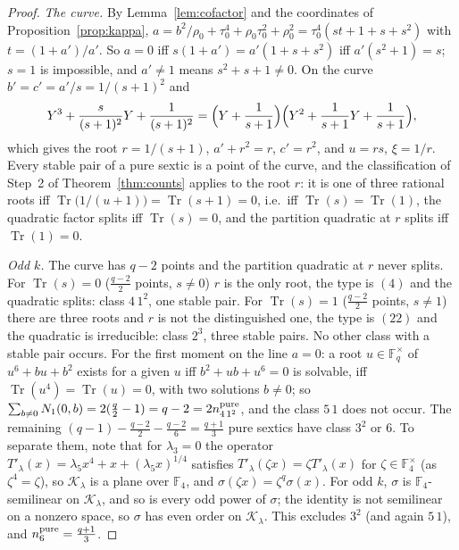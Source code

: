 \documentclass[12pt,a4paper]{amsart}
\theoremstyle{definition}
\newcommand{\F}{\mathbb{F}}
\newcommand{\Tr}{\operatorname{Tr}}
\newcommand{\Kk}{\mathcal{K}}
\begin{document}
\begin{proof}
\emph{The curve.} By Lemma~\ref{lem:cofactor} and the coordinates of Proposition~\ref{prop:kappa}, $a=b^2/\rho_0+\tau_0^4+\rho_0\tau_0^2+\rho_0^2=\tau_0^4(st+1+s+s^2)$ with $t=(1+a')/a'$. So $a=0$ iff $s(1+a')=a'(1+s+s^2)$ iff $a'(s^2+1)=s$; $s=1$ is impossible, and $a'\ne1$ means $s^2+s+1\ne0$. On the curve $b'=c'=a'/s=1/(s+1)^2$ and
\[
Y^3+\frac{s}{(s+1)^2}Y+\frac1{(s+1)^2}=\Bigl(Y+\frac1{s+1}\Bigr)\Bigl(Y^2+\frac1{s+1}Y+\frac1{s+1}\Bigr),
\]
which gives the root $r=1/(s+1)$, $a'+r^2=r$, $c'=r^2$, and $u=rs$, $\xi=1/r$. Every stable pair of a pure sextic is a point of the curve, and the classification of Step~2 of Theorem~\ref{thm:counts} applies to the root $r$: it is one of three rational roots iff $\Tr\bigl(1/(u+1)\bigr)=\Tr(s+1)=0$, i.e.\ iff $\Tr(s)=\Tr(1)$, the quadratic factor splits iff $\Tr(s)=0$, and the partition quadratic at $r$ splits iff $\Tr(1)=0$.

\emph{Odd $k$.} The curve has $q-2$ points and the partition quadratic at $r$ never splits. For $\Tr(s)=0$ ($\frac{q-2}2$ points, $s\ne0$) $r$ is the only root, the type is $(4)$ and the quadratic splits: class $4\,1^2$, one stable pair. For $\Tr(s)=1$ ($\frac{q-2}2$ points, $s\ne1$) there are three roots and $r$ is not the distinguished one, the type is $(22)$ and the quadratic is irreducible: class $2^3$, three stable pairs. No other class with a stable pair occurs. For the first moment on the line $a=0$: a root $u\in\F_q^\times$ of $u^6+bu+b^2$ exists for a given $u$ iff $b^2+ub+u^6=0$ is solvable, iff $\Tr(u^4)=\Tr(u)=0$, with two solutions $b\ne0$; so $\sum_{b\ne0}N_1(0,b)=2(\frac q2-1)=q-2=2n^{\rm pure}_{4\,1^2}$, and the class $5\,1$ does not occur. The remaining $(q-1)-\frac{q-2}2-\frac{q-2}6=\frac{q+1}3$ pure sextics have class $3^2$ or $6$. To separate them, note that for $\lambda_3=0$ the operator $T'_\lambda(x)=\lambda_5x^4+x+(\lambda_5x)^{1/4}$ satisfies $T'_\lambda(\zeta x)=\zeta T'_\lambda(x)$ for $\zeta\in\F_4^\times$ (as $\zeta^4=\zeta$), so $\Kk_\lambda$ is a plane over $\F_4$, and $\sigma(\zeta x)=\zeta^q\sigma(x)$. For odd $k$, $\sigma$ is $\F_4$-semilinear on $\Kk_\lambda$, and so is every odd power of $\sigma$; the identity is not semilinear on a nonzero space, so $\sigma$ has even order on $\Kk_\lambda$. This excludes $3^2$ (and again $5\,1$), and $n^{\rm pure}_6=\frac{q+1}3$.


\end{proof}
\end{document}
